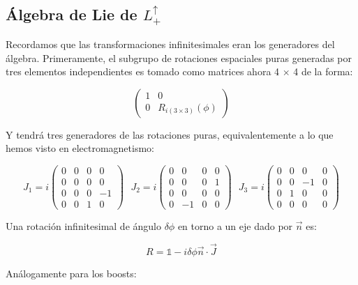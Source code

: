 \documentclass{article}
\begin{document}
        \subsection{Álgebra de Lie de $L^\uparrow_+$}

        Recordamos que las transformaciones infinitesimales eran los generadores del álgebra. Primeramente, el subgrupo de rotaciones espaciales puras generadas por tres elementos independientes es tomado como matrices ahora 4 $\times$ 4 de la forma:

        $$\left (\begin{array}{cccc}
            1 & 0 \\
            0 & R_{i(3\times 3)}(\phi)
        \end{array}\right )$$

    Y tendrá tres generadores de las rotaciones puras, equivalentemente a lo que hemos visto en electromagnetismo:


    $$J_1= i\left (\begin{array}{cccc}
    0 & 0 &  0 &  0\\
    0 & 0 &  0 & 0 \\
     0 & 0 & 0 & -1\\
       0 & 0 & 1 & 0
\end{array} \right )\ \ \ J_2= i\left (\begin{array}{cccc}
    0 & 0 &  0 &  0\\
    0 & 0 &  0 & 1 \\
     0 & 0 & 0 & 0\\
       0 & -1 & 0 & 0
\end{array} \right )\ \ \ J_3= i\left (\begin{array}{cccc}
    0 & 0 &  0 &  0\\
    0 & 0 &  -1 & 0 \\
     0 & 1 & 0 & 0\\
       0 & 0 & 0 & 0
\end{array} \right )$$


    Una rotación infinitesimal de ángulo $\delta \phi$ en torno a un eje dado por $\Vec{n}$ es:

    $$R=\mathds{1}-i\delta \phi \Vec{n}\cdot \Vec{J}$$

    Análogamente para los boosts:
\end{document}
